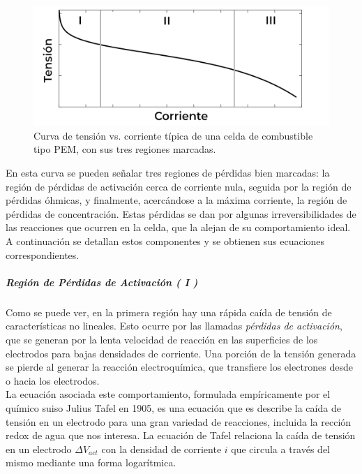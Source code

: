 \begin{figure}[h]
    \centering
    \includegraphics[scale=0.28]{Imagenes/Curva V-I Celda.png}
    \caption{Curva de tensión vs. corriente típica de una celda de combustible tipo PEM, con sus tres regiones marcadas.}
    \label{V-I_celda}
\end{figure}

En esta curva se pueden señalar tres regiones de pérdidas bien marcadas: la región de {\Medium pérdidas de activación} cerca de corriente nula, seguida por la región de {\Medium pérdidas óhmicas}, y finalmente, acercándose a la máxima corriente, la región de {\Medium pérdidas de concentración}. Estas pérdidas se dan por algunas irreversibilidades de las reacciones que ocurren en la celda, que la alejan de su comportamiento ideal. A continuación se detallan estos componentes y se obtienen sus ecuaciones correspondientes.\\

\subparagraph{Región de Pérdidas de Activación ( I )}

Como se puede ver, en la primera región hay una rápida caída de tensión de características no lineales. Esto ocurre por las llamadas \textit{pérdidas de activación}, que se generan por la lenta velocidad de reacción en las superficies de los electrodos para bajas densidades de corriente. Una porción de la tensión generada se pierde al generar la reacción electroquímica, que transfiere los electrones desde o hacia los electrodos.\\

La ecuación asociada este comportamiento, formulada empíricamente por el químico suiso Julius Tafel en 1905, es una ecuación que es describe la caída de tensión en un electrodo para una gran variedad de reacciones, incluida la rección redox de agua que nos interesa. La ecuación de Tafel relaciona la caída de tensión en un electrodo $\Delta V_{act}$ con la densidad de corriente $i$ que circula a través del mismo mediante una forma logarítmica.
    
